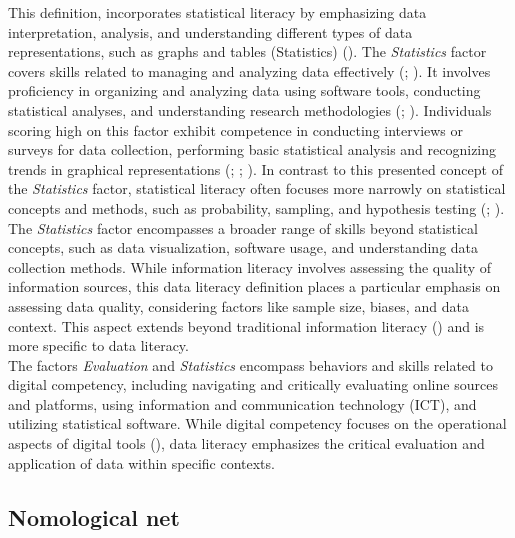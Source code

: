 \documentclass[
  12pt,
  a4paper,
  twoside]{article}
\begin{document}
This definition, incorporates statistical literacy by emphasizing data interpretation, analysis, and understanding different types of data representations, such as graphs and tables (Statistics) ().
The \emph{Statistics} factor covers skills related to managing and analyzing data effectively (; ). It involves proficiency in organizing and analyzing data using software tools, conducting statistical analyses, and understanding research methodologies (; ). Individuals scoring high on this factor exhibit competence in conducting interviews or surveys for data collection, performing basic statistical analysis and recognizing trends in graphical representations (; ; ). In contrast to this presented concept of the \emph{Statistics} factor, statistical literacy often focuses more narrowly on statistical concepts and methods, such as probability, sampling, and hypothesis testing (; ). The \emph{Statistics} factor encompasses a broader range of skills beyond statistical concepts, such as data visualization, software usage, and understanding data collection methods. While information literacy involves assessing the quality of information sources, this data literacy definition places a particular emphasis on assessing data quality, considering factors like sample size, biases, and data context. This aspect extends beyond traditional information literacy () and is more specific to data literacy.\\
The factors \emph{Evaluation} and \emph{Statistics} encompass behaviors and skills related to digital competency, including navigating and critically evaluating online sources and platforms, using information and communication technology (ICT), and utilizing statistical software. While digital competency focuses on the operational aspects of digital tools (), data literacy emphasizes the critical evaluation and application of data within specific contexts.

\subsection{Nomological net}\label{nomological-net}
\end{document}
